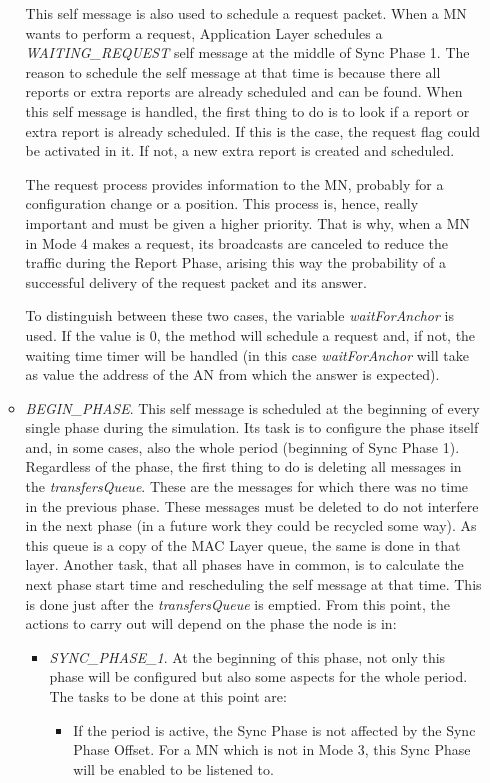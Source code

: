\begin{itemize}
\begin{itemize}
    This self message is also used to schedule a request packet. When a \ac{MN} wants to perform a request, Application Layer schedules a 
    \textit{WAITING\_REQUEST} self message at the middle of Sync Phase 1. The reason to schedule the self message at that time is because there all 
    reports or extra reports are already scheduled and can be found. When this self message is handled, the first thing to do is to look if a 
    report or extra report is already scheduled. If this is the case, the request flag could be activated in it. If not, a new extra report is 
    created and scheduled.

    The request process provides information to the \ac{MN}, probably for a configuration change or a position. This process is, hence, really 
    important and must be given a higher priority. That is why, when a \ac{MN} in Mode 4 makes a request, its broadcasts are canceled 
    to reduce the traffic during the Report Phase, arising this way the probability of a successful delivery of the request packet and its
    answer.

    To distinguish between these two cases, the variable \textit{waitForAnchor} is used. If the value is 0, the method will schedule a request
    and, if not, the waiting time timer will be handled (in this case \textit{waitForAnchor} will take as value the address of the \ac{AN} from
    which the answer is expected).

    \item \textit{BEGIN\_PHASE}. This self message is scheduled at the beginning of every single phase during the simulation. Its task is to 
    configure the phase itself and, in some cases, also the whole period (beginning of Sync Phase 1). Regardless of the phase, the first thing to
    do is deleting all messages in the \textit{transfersQueue}. These are the messages for which there was no time in the previous phase. These 
    messages must be deleted to do not interfere in the next phase (in a future work they could be recycled some way). As this queue is a copy of the
    \ac{MAC} Layer queue, the same is done in that layer. Another task, that all phases have in common, is to calculate the next phase start time
    and rescheduling the self message at that time. This is done just after the \textit{transfersQueue} is emptied. From this point, the actions
    to carry out will depend on the phase the node is in:
    \begin{itemize}
      \item \textit{SYNC\_PHASE\_1}. At the beginning of this phase, not only this phase will be configured but also some aspects for the whole
      period. The tasks to be done at this point are:
      \begin{itemize}
	\item If the period is active, the Sync Phase is not affected by the Sync Phase Offset. For a \ac{MN} which is not in Mode 3, this Sync Phase will
	be enabled to be listened to.


\end{itemize}
\end{itemize}
\end{itemize}
\end{itemize}
